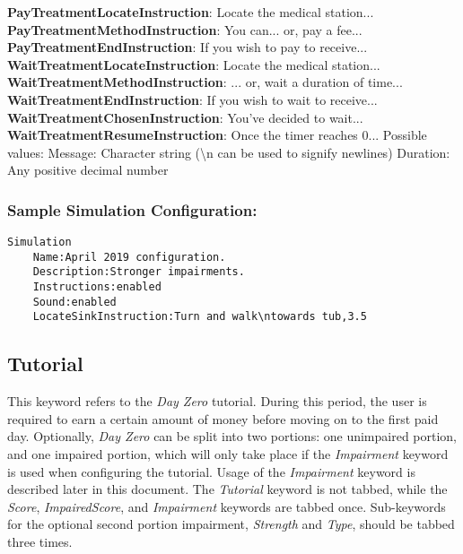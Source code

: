 \documentclass{article}
\begin{document}
\newline \indent\indent \textbf{PayTreatmentLocateInstruction}: Locate the medical station... 
\newline \indent\indent \textbf{PayTreatmentMethodInstruction}: You can... or, pay a fee... 
\newline \indent\indent \textbf{PayTreatmentEndInstruction}: If you wish to pay to receive... 
\newline \indent\indent \textbf{WaitTreatmentLocateInstruction}: Locate the medical station... 
\newline \indent\indent \textbf{WaitTreatmentMethodInstruction}: ... or, wait a duration of time... 
\newline \indent\indent \textbf{WaitTreatmentEndInstruction}: If you wish to wait to receive... 
\newline \indent\indent \textbf{WaitTreatmentChosenInstruction}: You've decided to wait...
\newline \indent\indent \textbf{WaitTreatmentResumeInstruction}: Once the timer reaches 0... 
\newline \newline \newline \indent Possible values: \newline
\indent\indent Message: Character string (\textbackslash n can be used to signify newlines) \newline
\indent\indent Duration: Any positive decimal number 

\subsubsection*{Sample Simulation Configuration:}
\begin{lstlisting}
Simulation
    Name:April 2019 configuration.
    Description:Stronger impairments.
    Instructions:enabled
    Sound:enabled
    LocateSinkInstruction:Turn and walk\ntowards tub,3.5
\end{lstlisting} 

\subsection*{Tutorial}
This keyword refers to the \textit{Day Zero} tutorial. During this period, the user is required to earn a certain amount of money before moving on to the first paid day. Optionally, \textit{Day Zero} can be split into two portions: one unimpaired portion, and one impaired portion, which will only take place if the \textit{Impairment} keyword is used when configuring the tutorial. Usage of the \textit{Impairment} keyword is described later in this document. The \textit{Tutorial} keyword is not tabbed, while the \textit{Score}, \textit{ImpairedScore}, and \textit{Impairment} keywords are tabbed once. Sub-keywords for the optional second portion impairment, \textit{Strength} and \textit{Type}, should be tabbed three times.
\end{document}
